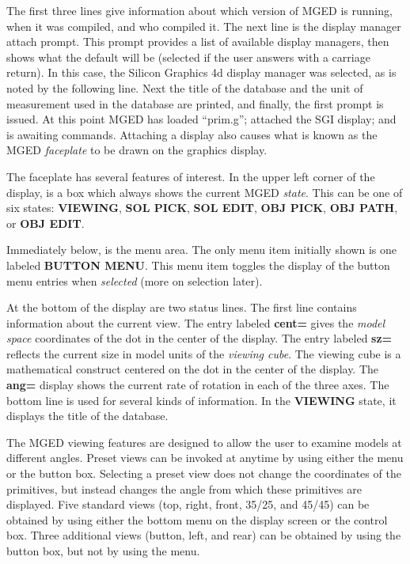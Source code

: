 The first three lines give information about which version of MGED is running,
when it was compiled, and who compiled it.  The next line is the display
manager attach prompt.  This prompt provides a list of available display
managers, then shows what the default will be (selected if the user answers
with a carriage return).  In this case, the Silicon Graphics 4d display
manager was selected, as is noted by the following line.
Next the title of the database and
the unit of measurement used in the database are printed,
and finally, the first prompt is issued.
At this point MGED has loaded ``prim.g''; attached the SGI display;
and is awaiting commands.  Attaching a display also causes what
is known as the MGED {\sl faceplate} to be drawn on the graphics display.

The faceplate has several features of interest.  In the upper left corner
of the display, is a box which always shows the current MGED {\sl state}.
This can be one of six states:  {\bf VIEWING}, {\bf SOL PICK},
{\bf SOL EDIT}, {\bf OBJ PICK}, {\bf OBJ PATH}, or {\bf OBJ EDIT}.

Immediately below, is the menu area.  The only menu item initially shown is
one labeled {\bf BUTTON MENU}.  This menu item toggles the display of the
button menu entries when {\sl selected} (more on selection later).

At the bottom of the display are two status lines.  The first line
contains information about the current view.
The entry labeled {\bf cent=} gives the {\sl model space} coordinates
of the dot in the center of the display.
The entry labeled {\bf sz=} reflects the current size in model units of
the {\sl viewing cube}.  The viewing cube is a mathematical construct
centered on the dot in the center of the display.  The {\bf ang=}
display shows the current rate of rotation in each of the three axes.
The bottom line is used for several kinds of information.
In the {\bf VIEWING} state, it displays the title of the database.

The MGED viewing features are designed to allow the user to examine
models at different angles.
Preset views can be invoked at
anytime by using either the menu or the button box.
Selecting a preset view does
not change the coordinates of the primitives,
but instead changes the angle from which these primitives are
displayed.  Five standard views (top, right, front, 35/25, and 45/45) can
be obtained by using either the bottom menu on the display screen or the
control box.
Three additional views (button, left, and rear) can be obtained
by using the button box, but not by using the menu.

